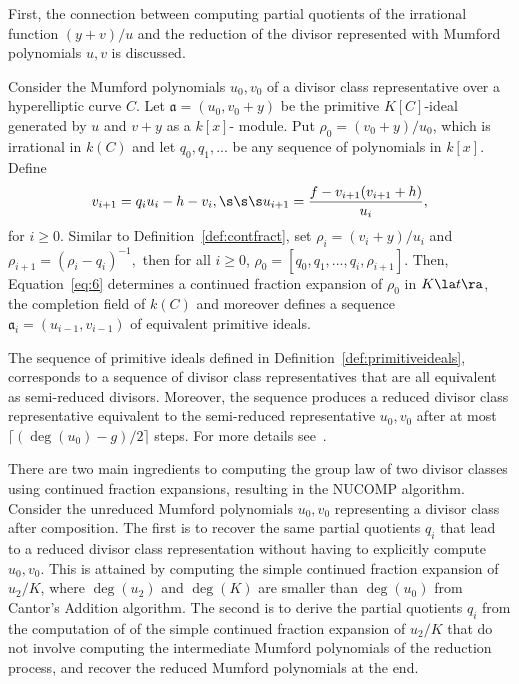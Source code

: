 First, the connection between computing partial quotients of the irrational
function $(y+v)/u$ and the reduction of the divisor represented with Mumford
polynomials $u,v$ is discussed.

\bd\label{def:primitiveideals}\cite[Section~2.1]{ImbJac13:amc} Consider
the Mumford polynomials $u_0,v_0$ of a divisor class representative over a
hyperelliptic curve $C$. Let $\mathfrak{a} = (u_0,v_0 + y)$ be the primitive
$K[C]$-ideal generated by $u$ and $v + y$ as a $k[x]$- module. Put $\rho_0
= (v_0 + y)/u_0$, which is irrational in $k(C)$ and let $q_0,q_1,... $ be any
sequence of polynomials in $k[x]$. Define
\begin{equation}\label{eq:6} v_{i+1} = q_iu_i - h - v_i, \s\s\s
u_{i+1} = \frac{f - v_{i+1}(v_{i+1} + h)}{u_i},
\end{equation}
for $i \geq 0$. Similar to Definition~\ref{def:contfract}, set $\rho_i = (v_i
+y)/u_i$ and $\rho_{i+1} = (\rho_i - q_i)^{-1},$ then for all $i \geq 0$,
$\rho_0 = [q_0,q_1,...,q_i,\rho_{i+1}]$. Then, Equation~\eqref{eq:6}
determines a continued fraction expansion of $\rho_0$ in $K\la t \ra$, the
completion field of $k(C)$ and moreover defines a sequence $\mathfrak{a}_i = (
u_{i-1},v_{i-1})$ of equivalent primitive ideals.
\ed

The sequence of primitive ideals defined in
Definition~\ref{def:primitiveideals}, corresponds to a sequence of divisor class
representatives that are all equivalent as semi-reduced divisors. Moreover, the
sequence produces a reduced divisor class representative equivalent to the
semi-reduced representative $u_0,v_0$ after at most $\lceil (\deg(u_0) - g)/2
\rceil$ steps.  For more details see~\cite[Section~5]{jacobson_fast_2007}.

There are two main ingredients to computing the group law of two divisor classes
using continued fraction expansions, resulting in the NUCOMP algorithm. Consider
the unreduced Mumford polynomials $u_0,v_0$ representing a divisor class after
composition. The first is to recover the same partial quotients $q_i$ that lead
to a reduced divisor class representation without having to explicitly compute
$u_0,v_0$. This is attained by computing the simple continued fraction expansion
of $u_2/K$, where $\deg(u_2)$ and $\deg(K)$ are smaller than $\deg(u_0)$ from
Cantor's Addition algorithm. The second is to derive the partial quotients $q_i$
from the computation of of the simple continued fraction expansion of $u_2/K$
that do not involve computing the intermediate Mumford polynomials of the
reduction process, and recover the reduced Mumford polynomials at the end.

